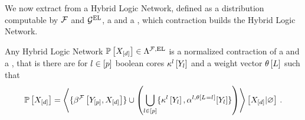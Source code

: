 We now extract from a Hybrid Logic Network, defined as a distribution computable by $\mathcal{F}$ and $\mathcal{G}^{\mathrm{EL}}$, a \HardLogicNetwork{} and a \MarkovLogicNetwork{}, which contraction builds the Hybrid Logic Network.

\begin{theorem}
    \label{the:hybridNetworkRepresentation}
    Any Hybrid Logic Network $\mathbb{P}\left[X_{[d]}\right]\in\Lambda^{\mathcal{F},\mathrm{EL}}$ is a normalized contraction of a \HardLogicNetwork{} and a \MarkovLogicNetwork{}, that is there are for $l\in[p]$ boolean cores $\kappa^{l}\left[Y_{l}\right]$ and a weight vector $\theta\left[L\right]$ such that
    \begin{align*}
        \mathbb{P}\left[X_{[d]}\right] =
        \left\langle 
            \{\beta^{\mathcal{F}}\left[Y_{[p]},X_{[d]}\right]\}
            \cup \left(\bigcup_{l\in[p]}\{\kappa^{l}\left[Y_{l}\right],\alpha^{l,\theta\left[L_{}=l_{}\right]}[Y_{l}]\}\right)
        \right\rangle \left[ X_{[d]} | \varnothing \right] \, .
    \end{align*}
\end{theorem}

